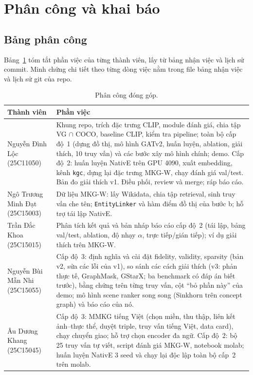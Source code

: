 \section{Phân công và khai báo}
\label{sec:contrib}

\subsection{Bảng phân công}

Bảng~\ref{tab:contrib} tóm tắt phần việc của từng thành viên, lấy từ bảng nhận việc  và lịch sử
commit. Minh chứng chi tiết theo từng dòng việc nằm trong file bảng nhận việc và lịch sử git của repo.

\begin{table}[t]
\centering
\caption{Phân công đóng góp.}
\label{tab:contrib}
\footnotesize
\begin{tabular}{p{3.6cm}p{13.2cm}}
\toprule
Thành viên & Phần việc \\
\midrule
Nguyễn Đình Lộc (25C11050) &
Khung repo, trích đặc trưng CLIP, module đánh giá, chia tập VG $\cap$ COCO, baseline CLIP, kiểm tra pipeline; toàn bộ cấp
độ~1 (dựng đồ thị, mô hình GATv2, huấn luyện, ablation, giải thích, 10 truy vấn) và các bước xây mô hình chính; demo. Cấp
độ~2: huấn luyện NativE trên GPU 4090, xuất embedding, kênh \texttt{kgc}, dựng lại đặc trưng MKG-W, chạy đánh giá val/test.
Bản đo giải thích v1. Điều phối, review và merge; ráp báo cáo. \\
Ngô Trương Minh Đạt (25C15003) &
Dữ liệu MKG-W: lấy Wikidata, chia tập retrieval, sinh truy vấn che tên; \texttt{EntityLinker} và hàm điểm đồ thị của bước b;
hỗ trợ tái lập NativE. \\
Trần Đắc Khoa (25C15015) &
Phân tích kết quả và bản nháp báo cáo cấp độ~2 (tái lập, bảng val/test, ablation, độ nhạy $\alpha$, trực tiếp/gián tiếp);
ví dụ giải thích trên MKG-W. \\
Nguyễn Bùi Mẫn Nhi (25C15055) &
Cấp độ~3: định nghĩa và cài đặt fidelity, validity, sparsity (bản v2, sửa các lỗi của v1), so sánh các cách giải thích
(v3: phản thực tế, GraphMask, GStarX; ba benchmark có đáp án biết trước),
bằng chứng trên từng truy vấn, cột ``bỏ phần này'' của demo; mô hình scene ranker song song (Sinkhorn trên concept graph)
và báo cáo của nó. \\
Âu Dương Khang (25C15045) &
Cấp độ~3: MMKG tiếng Việt (chọn miền, thu thập, liên kết ảnh--thực thể, duyệt triple, truy vấn tiếng Việt, data card),
chạy chuyển giao; hỗ trợ chọn encoder đa ngữ. Cấp độ~2: bộ 25 truy vấn tự viết, script đánh giá MKG-W, notebook molab;
huấn luyện NativE 3 seed và chạy lại độc lập toàn bộ cấp~2 trên molab. \\
\bottomrule
\end{tabular}
\end{table}

